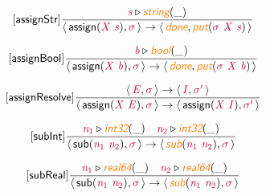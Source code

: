 \documentclass[10pt,leqno,fleqn]{article}
\newcommand{\artVariable}[1]{\mbox{\color{purple}\em #1\/}}
\newcommand{\artConstructor}[1]{\mbox{\sf #1}}
\newcommand{\artSpecial}[1]{\mbox{\color{orange}\sf\em #1}}
\begin{document}
\begin{equation}
\tag*{[\artConstructor{\sf assignStr}]}
\begin{split}\frac{ \artVariable{s}\triangleright \artSpecial{string}(\_) }{\langle\, \artConstructor{\sf assign}(\artVariable{X}\ \artVariable{s}), \artVariable{$\sigma$}\,\rangle \rightarrow \langle\, \artSpecial{done}, \artSpecial{put}(\artVariable{$\sigma$}\ \artVariable{X}\ \artVariable{s})\,\rangle }
\end{split}
\end{equation}

\begin{equation}
\tag*{[\artConstructor{\sf assignBool}]}
\begin{split}\frac{ \artVariable{b}\triangleright \artSpecial{bool}(\_) }{\langle\, \artConstructor{\sf assign}(\artVariable{X}\ \artVariable{b}), \artVariable{$\sigma$}\,\rangle \rightarrow \langle\, \artSpecial{done}, \artSpecial{put}(\artVariable{$\sigma$}\ \artVariable{X}\ \artVariable{b})\,\rangle }
\end{split}
\end{equation}

\begin{equation}
\tag*{[\artConstructor{\sf assignResolve}]}
\begin{split}\frac{\langle\, \artVariable{E}, \artVariable{$\sigma$}\,\rangle \rightarrow \langle\, \artVariable{I}, \artVariable{$\sigma$\/$^\prime$}\,\rangle }{\langle\, \artConstructor{\sf assign}(\artVariable{X}\ \artVariable{E}), \artVariable{$\sigma$}\,\rangle \rightarrow \langle\, \artConstructor{\sf assign}(\artVariable{X}\ \artVariable{I}), \artVariable{$\sigma$\/$^\prime$}\,\rangle }
\end{split}
\end{equation}

\begin{equation}
\tag*{[\artConstructor{\sf subInt}]}
\begin{split}\frac{ \artVariable{n$_{1}$}\triangleright \artSpecial{int32}(\_) \quad  \artVariable{n$_{2}$}\triangleright \artSpecial{int32}(\_) }{\langle\, \artConstructor{\sf sub}(\artVariable{n$_{1}$}\ \artVariable{n$_{2}$}), \artVariable{$\sigma$}\,\rangle \rightarrow \langle\, \artSpecial{sub}(\artVariable{n$_{1}$}\ \artVariable{n$_{2}$}), \artVariable{$\sigma$}\,\rangle }
\end{split}
\end{equation}

\begin{equation}
\tag*{[\artConstructor{\sf subReal}]}
\begin{split}\frac{ \artVariable{n$_{1}$}\triangleright \artSpecial{real64}(\_) \quad  \artVariable{n$_{2}$}\triangleright \artSpecial{real64}(\_) }{\langle\, \artConstructor{\sf sub}(\artVariable{n$_{1}$}\ \artVariable{n$_{2}$}), \artVariable{$\sigma$}\,\rangle \rightarrow \langle\, \artSpecial{sub}(\artVariable{n$_{1}$}\ \artVariable{n$_{2}$}), \artVariable{$\sigma$}\,\rangle }
\end{split}
\end{equation}
\end{document}
